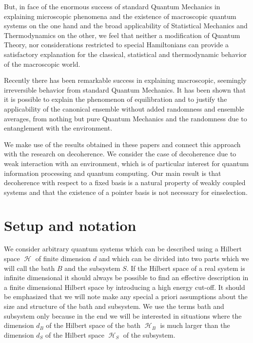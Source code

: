 \documentclass[aps,prl,twocolumn,showpacs,showkeys,a4paper]{revtex4}
\DeclareMathOperator{\hiH}{\mathcal{H}}%
\begin{document}
But, in face of the enormous success of standard Quantum Mechanics in explaining microscopic phenomena and the existence of macroscopic quantum systems on the one hand and the broad applicability of Statistical Mechanics and Thermodynamics on the other, we feel that neither a modification of Quantum Theory, nor considerations restricted to special Hamiltonians can provide a satisfactory explanation for the classical, statistical and thermodynamic behavior of the macroscopic world.

Recently there has been remarkable success in explaining macroscopic, seemingly irreversible behavior from standard Quantum Mechanics.
It has been shown that it is possible to explain the phenomenon of equilibration \cite{gemmermichelmahler04,Reimann08,Linden09,0907.1267v1} and to justify the applicability of the canonical ensemble \cite{Popescu06} without added randomness and ensemble averages, from nothing but pure Quantum Mechanics and the randomness due to entanglement with the environment.

We make use of the results obtained in these papers and connect this approach with the research on decoherence.
We consider the case of decoherence due to weak interaction with an environment, which is of particular interest for quantum information processing and quantum computing.
Our main result is that decoherence with respect to a fixed basis is a natural property of weakly coupled systems and that the existence of a pointer basis is not necessary for einselection.


\section{Setup and notation}
\label{sec:setupanddefinitions}
%
We consider arbitrary quantum systems which can be described using a Hilbert space $\hiH$ of finite dimension $d$ and which can be divided into two parts which we will call the bath $B$ and the subsystem $S$.
If the Hilbert space of a real system is infinite dimensional it should always be possible to find an effective description in a finite dimensional Hilbert space by introducing a high energy cut-off.
It should be emphasized that we will note make any special a priori assumptions about the size and structure of the bath and subsystem.
We use the terms bath and subsystem only because in the end we will be interested in situations where the dimension $d_B$ of the Hilbert space of the bath $\hiH_B$ is much larger than the dimension $d_S$ of the Hilbert space $\hiH_S$ of the subsystem.
\end{document}
